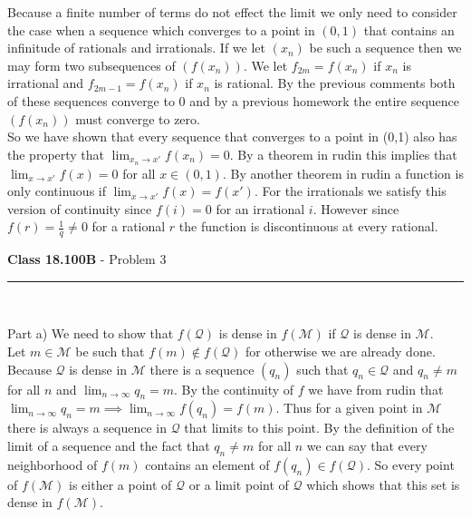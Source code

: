 \documentclass[11pt,reqno]{article}
\begin{document}
\indent Because a finite number of terms do not effect the limit we only need to consider the case when a sequence which converges to a point in $(0,1)$ that contains an infinitude of rationals and irrationals. If we let $(x_n)$ be such a sequence then we may form two subsequences of $(f(x_n))$. We let $f_{2m} = f(x_n)$ if $x_n$ is irrational and $f_{2m-1} = f(x_n)$ if $x_n$ is rational. By the previous comments both of these sequences converge to 0 and by a previous homework the entire sequence $(f(x_n))$ must converge to zero.\\
\indent So we have shown that every sequence that converges to a point in (0,1) also has the property that $\lim_{x_n \to x'} f(x_n) = 0$. By a theorem in rudin this implies that $\lim_{x \to x'} f(x) = 0$ for all $x \in (0,1)$. By another theorem in rudin a function is only continuous if $\lim_{x \to x'} f(x) =f(x')$. For the irrationals we satisfy this version of continuity since $f(i) = 0$ for an irrational $i$. However since $f(r) = \frac{1}{q} \neq 0$ for a rational $r$ the function is discontinuous at every rational.

\vspace{15pt}
\begin{flushleft} 
\textbf{Class 18.100B} - Problem 3\\
\rule{500pt}{1pt}\\
\end{flushleft} 

\noindent Part a) We need to show that $f(\mathcal{Q})$ is dense in $f(\mathcal{M})$ if $\mathcal{Q}$ is dense in $\mathcal{M}$.\\
\indent Let $m \in \mathcal{M}$ be such that $f(m) \notin f(\mathcal{Q})$ for otherwise we are already done. Because $\mathcal{Q}$ is dense in $\mathcal{M}$ there is a sequence $(q_n)$ such that $q_n \in \mathcal{Q}$ and $q_n \neq m$ for all $n$ and $\lim_{n \to \infty} q_n = m$. By the continuity of $f$ we have from rudin that $\lim_{n \to \infty} q_n = m \implies \lim_{n \to \infty}f(q_n) = f(m)$. Thus for a given point in $\mathcal{M}$ there is always a sequence in $\mathcal{Q}$ that limits to this point. By the definition of the limit of a sequence and the fact that $q_n \neq m$ for all $n$ we can say that every neighborhood of $f(m)$ contains an element of $f(q_n) \in f(\mathcal{Q})$. So every point of $f(\mathcal{M})$ is either a point of $\mathcal{Q}$ or a limit point of $\mathcal{Q}$ which shows that this set is dense in $f(\mathcal{M})$.\\
\end{document}
